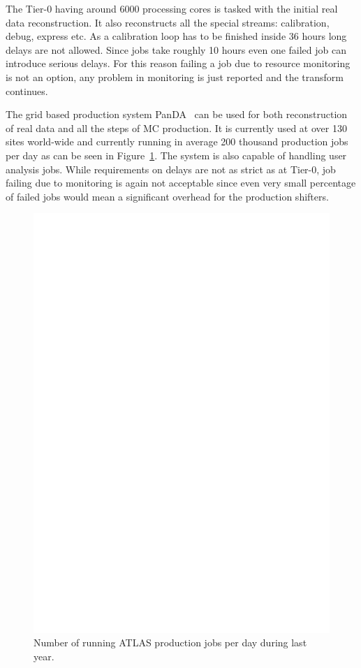 \documentclass[a4paper]{jpconf}
\begin{document}
The Tier-0 having around 6000 processing cores is tasked with the initial real data reconstruction. It also reconstructs all the special streams: calibration, debug, express etc. As a calibration loop has to be finished inside 36 hours long delays are not allowed. Since jobs take roughly 10 hours even one failed job can introduce serious delays. For this reason failing a job due to resource monitoring is not an option, any problem in monitoring is just reported and the transform continues.

The grid based production system PanDA~\cite{panda} can be used for both reconstruction of real data and all the steps of MC production.
It is currently used at over 130 sites world-wide and currently running in average 200 thousand production jobs per day as can be seen in Figure~\ref{fig:jobsLastYear}. The system is also capable of handling user analysis jobs. While requirements on delays are not as strict as at Tier-0, job failing due to monitoring is again not acceptable since even very small percentage of failed jobs would mean a significant overhead for the production shifters.  


\begin{figure}
  \centering
  \includegraphics[width=\columnwidth]{jobsLastYear.eps}
  \caption{Number of running ATLAS production jobs per day during last year.}
  \label{fig:jobsLastYear}
\end{figure}
\end{document}
